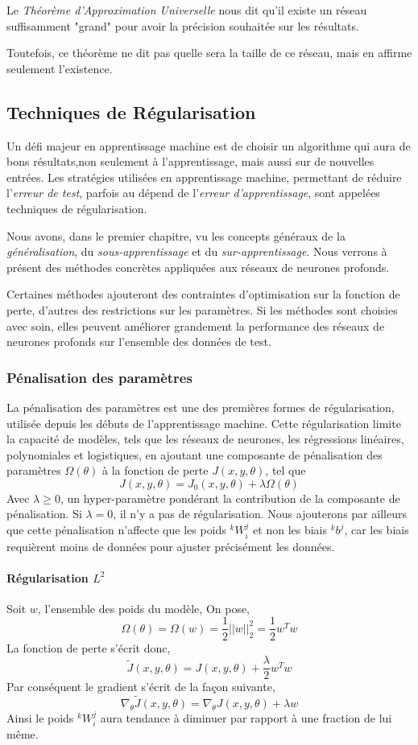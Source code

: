 \documentclass[a4paper, 10pt]{report}
\newcommand{\lexp}[1]{\phantom{}^{#1}}
\newcommand{\elem}[4]{\lexp{#2}#1^{#3}_{#4}}
\begin{document}
Le \emph{Théorème d'Approximation Universelle} nous dit qu'il existe un réseau suffisamment "grand" pour avoir la précision souhaitée sur les résultats.

Toutefois, ce théorème ne dit pas quelle sera la taille de ce réseau, mais en affirme seulement l'existence.
\subsection{Techniques de Régularisation}
Un défi majeur en apprentissage machine est de choisir un algorithme qui aura de bons résultats,non seulement à l'apprentissage, mais aussi sur de nouvelles entrées.
Les stratégies utilisées en apprentissage machine, permettant de réduire l'\emph{erreur de test}, parfois au dépend de l'\emph{erreur d'apprentissage}, sont appelées techniques de régularisation.

Nous avons, dans le premier chapitre, vu les concepts généraux de la \emph{généralisation}, du \emph{sous-apprentissage} et du \emph{sur-apprentissage}.
Nous verrons à présent des méthodes concrètes appliquées aux réseaux de neurones profonds.

Certaines méthodes ajouteront des contraintes d'optimisation sur la fonction de perte, d'autres des restrictions sur les paramètres.
Si les méthodes sont choisies avec soin, elles peuvent améliorer grandement la performance des réseaux de neurones profonds sur l'ensemble des données de test.
\subsubsection{Pénalisation des paramètres}
La pénalisation des paramètres est une des premières formes de régularisation, utilisée depuis les débuts de l'apprentissage machine.
Cette régularisation limite la capacité de modèles, tels que les réseaux de neurones, les régressions linéaires, polynomiales et logistiques, en ajoutant une composante de pénalisation des paramètres $\Omega(\theta)$ à la fonction de perte $J(x,y,\theta)$, tel que
$$J(x,y,\theta) = J_0(x,y,\theta) + \lambda \Omega(\theta)$$
Avec $\lambda \geq 0$, un hyper-paramètre pondérant la contribution de la composante de pénalisation.
Si $\lambda = 0$, il n'y a pas de régularisation.
Nous ajouterons par ailleurs que cette pénalisation n'affecte que les poids $\elem{W}{k}{j}{i}$ et non les biais $\elem{b}{k}{j}{}$, car les biais requièrent moins de données pour ajuster précisément les données.
\paragraph{Régularisation $L^2$}
Soit $w$, l'ensemble des poids du modèle,
On pose, $$\Omega(\theta) = \Omega(w) = \frac{1}{2} ||w||_2^2 = \frac{1}{2} w^T w$$
La fonction de perte s'écrit donc,
$$\tilde{J}(x,y,\theta) = J(x,y,\theta) + \frac{\lambda}{2} w^T w$$
Par conséquent le gradient s'écrit de la façon suivante,
$$\nabla_\theta \tilde{J}(x,y,\theta) = \nabla_\theta J(x,y,\theta) + \lambda w$$
Ainsi le poids $\elem{W}{k}{j}{i}$ aura tendance à diminuer par rapport à une fraction de lui même.
\end{document}

